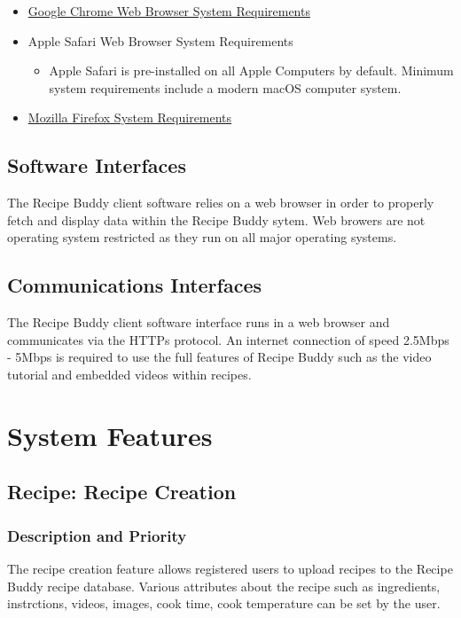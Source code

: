 \documentclass{scrreprt}
\begin{document}
\begin{itemize}
    \item \href{https://support.google.com/chrome/a/answer/7100626?hl=en}{Google Chrome Web Browser System Requirements}
    \item Apple Safari Web Browser System Requirements
          \begin{itemize}
              \item Apple Safari is pre-installed on all Apple Computers by default. Minimum system requirements include a modern macOS computer system.
          \end{itemize}
    \item \href{https://www.mozilla.org/en-US/firefox/92.0.1/system-requirements/}{Mozilla Firefox System Requirements}
\end{itemize}

\section{Software Interfaces}
The Recipe Buddy client software relies on a web browser in order to properly fetch and display data within the Recipe Buddy sytem. Web browers are not operating system restricted as they run on all major operating systems.

\section{Communications Interfaces}
The Recipe Buddy client software interface runs in a web browser and communicates via the HTTPs protocol. An internet connection of speed 2.5Mbps - 5Mbps is required to use the full features of Recipe Buddy such as the video tutorial and embedded videos within recipes.

\chapter{System Features}

\section{Recipe: Recipe Creation}

\subsection{Description and Priority}

The recipe creation feature allows registered users to upload recipes to the Recipe Buddy recipe database. Various attributes about the recipe such as ingredients, instrctions, videos, images, cook time, cook temperature can be set by the user.
\end{document}
